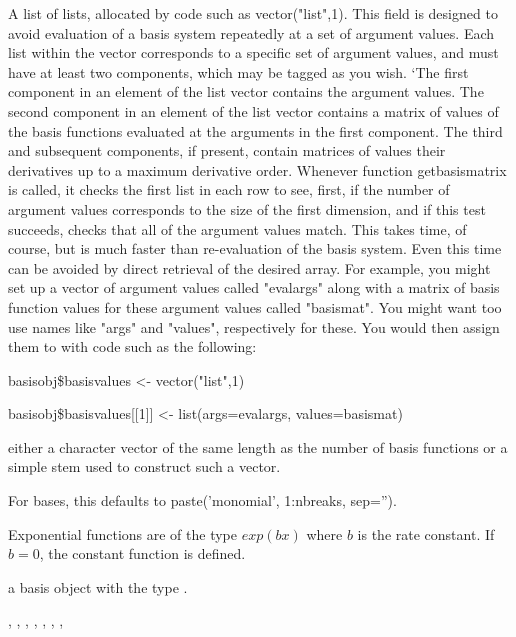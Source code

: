 \begin{Arguments}
\begin{ldescription}
\item[\code{basisvalues}] A list of lists, allocated by code such as vector("list",1).  This
field is designed to avoid evaluation of a basis system repeatedly
at a set of argument values.  Each list within the vector
corresponds to a specific set of argument values, and must have at
least two components, which may be tagged as you wish.  `The first
component in an element of the list vector contains the argument
values.  The second component in an element of the list vector
contains a matrix of values of the basis functions evaluated at the
arguments in the first component.  The third and subsequent
components, if present, contain matrices of values their derivatives
up to a maximum derivative order.  Whenever function getbasismatrix
is called, it checks the first list in each row to see, first, if
the number of argument values corresponds to the size of the first
dimension, and if this test succeeds, checks that all of the
argument values match.  This takes time, of course, but is much
faster than re-evaluation of the basis system.  Even this time can
be avoided by direct retrieval of the desired array.  For example,
you might set up a vector of argument values called "evalargs" along
with a matrix of basis function values for these argument values
called "basismat".  You might want too use names like "args" and
"values", respectively for these.  You would then assign them to
 with code such as the following:

basisobj\$basisvalues <- vector("list",1)

basisobj\$basisvalues[[1]] <- list(args=evalargs,
values=basismat)

\item[\code{names}] either a character vector of the same length as the number of basis
functions or a simple stem used to construct such a vector.

For  bases, this defaults to paste('monomial',
1:nbreaks, sep='').

\end{ldescription}
\end{Arguments}
\begin{Details}\relax
Exponential functions are of the type $exp(bx)$ where $b$
is the rate constant.  If $b = 0$, the constant function is
defined.
\end{Details}
\begin{Value}
a basis object with the type .
\end{Value}
\begin{SeeAlso}\relax
{},
,
,
,
,
,
,
\end{SeeAlso}
